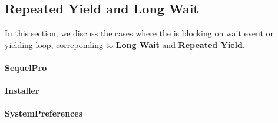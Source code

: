 \subsection{Repeated Yield and Long Wait}
In this section, we discuss the cases where the \spinningnode is blocking on
wait event or yielding loop, correponding to \textbf{Long Wait} and \textbf{Repeated Yield}.
\paragraph{SequelPro}

\paragraph{Installer}

\paragraph{SystemPreferences}


